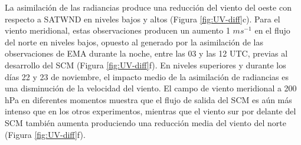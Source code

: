 \documentclass[12pt,oneside]{reedthesis}
\begin{document}
La asimilación de las radiancias produce una reducción del viento del oeste con respecto a SATWND en niveles bajos y altos (Figura \ref{fig:UV-diff}c). Para el viento meridional, estas observaciones producen un aumento 1 \(ms^{-1}\) en el flujo del norte en niveles bajos, opuesto al generado por la asimilación de las observaciones de EMA durante la noche, entre las 03 y las 12 UTC, previas al desarrollo del SCM (Figura \ref{fig:UV-diff}f). En niveles superiores y durante los días 22 y 23 de noviembre, el impacto medio de la asimilación de radiancias es una disminución de la velocidad del viento. El campo de viento meridional a 200 hPa en diferentes momentos muestra que el flujo de salida del SCM es aún más intenso que en los otros experimentos, mientras que el viento sur por delante del SCM también aumenta produciendo una reducción media del viento del norte (Figura \ref{fig:UV-diff}f).
\end{document}
